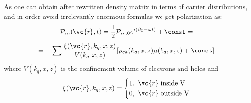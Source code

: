 As one can obtain after rewritten density matrix in terms of carrier distributions, and in order avoid irrelevantly enormous formulas we get polarization as:
\begin{equation*}
	\mathcal{P}_{in}(\vc{r}, t) = \frac{1}{2} \mathcal{P}_{in,0} e^{i (\beta y - \omega t)} + \const =
\end{equation*}
\begin{equation*}
	= - \sum \frac{\xi(\vc{r},k_q, x, z)}{V(k_q, x, z)}[\rho_{eh}(k_q, x, z)\mu(k_q, x, z) + \const]	
\end{equation*}
where $V(k_q, x, z)$ is the confinement volume of electrons and holes and
\begin{equation*}
	\xi(\vc{r}, k_q, x, z) = 
	\left\{ \begin{aligned}
		&1, \ \vc{r} \text{ inside V}\\
		&0, \ \vc{r} \text{ outside V}
	\end{aligned}
	\right.
\end{equation*}

